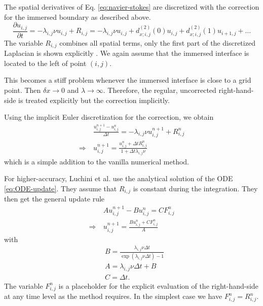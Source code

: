 \documentclass{article}
\numberwithin{equation}{section}
\newcommand{\pd}[2]{\dfrac{\partial #1}{\partial #2}}
\begin{document}
The spatial derivatives of Eq. \eqref{eq:navier-stokes} are discretized with the correction for the immersed boundary as described above.
\begin{equation}
    \pd{u_{i,j}}{t}
    = -\lambda_{i,j} \nu u_{i,j} +  R_{i,j}
    = -\lambda_{i,j} \nu u_{i,j}
    + d^{(2)}_{x;i,j}( 0) u_{i,  j}
    + d^{(2)}_{x;i,j}( 1) u_{i+1,j}
    + \dots
    \label{eq:ODE-update}
\end{equation}
The variable $R_{i,j}$ combines all spatial terms, only the first part of the discretized Laplacian is shown explicitly \cite{luchiniSimpleEfficientSecondorder2025}.
We again assume that the immersed interface is located to the left of point $(i,j)$.

This becomes a stiff problem whenever the immersed interface is close to a grid point.
Then $\delta x \to 0$ and $\lambda \to \infty$.
Therefore, the regular, uncorrected right-hand-side is treated explicitly but the correction implicitly.

Using the implicit Euler discretization for the correction, we obtain
\begin{equation}
    \begin{split}
        &\frac{u_{i,j}^{n+1} - u_{i,j}^n}{\Delta t} =
        -\lambda_{i,j} \nu u_{i,j}^{n+1} + R_{i,j}^n \\
        \Rightarrow\ 
        &u_{i,j}^{n+1} =
        \frac{u_{i,j}^n + \Delta t R_{i,j}^n}{1 + \Delta t \lambda_{i,j} \nu}
    \end{split}
    \label{eq:update_u_implicit_euler}
\end{equation}
which is a simple addition to the vanilla numerical method.

For higher-accuracy, Luchini et al. use the analytical solution of the ODE \eqref{eq:ODE-update}.
They assume that $R_{i,j}$ is constant during the integration.
They then get the general update rule
\begin{equation}
    \begin{split}
        &A u_{i,j}^{n+1} - B u_{i,j}^n = C F_{i,j}^n \\
        \Rightarrow\ 
        &u_{i,j}^{n+1} = \frac{B u_{i,j}^n + C F_{i,j}^n}{A}
    \end{split}
    \label{eq:analytical-correction}
\end{equation}
with
\begin{equation}
    \begin{split}
        &B = \frac{\lambda_{i,j} \nu \Delta t}{\exp(\lambda_{i,j} \nu \Delta t) - 1} \\
        &A = \lambda_{i,j} \nu \Delta t + B \\
        &C = \Delta t.
    \end{split}
\end{equation}
The variable $F_{i,j}^n$ is a placeholder for the explicit evaluation of the right-hand-side at any time level as the method requires.
In the simplest case we have $F_{i,j}^n = R_{i,j}^n$.
\end{document}
